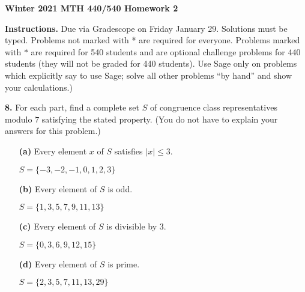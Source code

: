 \documentclass[12pt]{amsart}
\begin{document}
{\bf Winter 2021 MTH 440/540 Homework 2}

\medskip

{\bf Instructions.}  Due via Gradescope on Friday January 29.  Solutions must be typed.  Problems not marked with * are required for everyone.  Problems marked with $*$ are required for 540 students and are optional challenge problems for 440 students  (they will not be graded for 440 students).  Use Sage only on problems which explicitly say to use Sage; solve all other problems ``by hand'' and show your calculations.)

\medskip

{\bf 8.} For each part, find a complete set $S$ of congruence class representatives modulo $7$ satisfying the stated property. (You do not have to explain your answers for this problem.)
\begin{itemize}
\item[{\bf (a)}] Every element $x$ of $S$ satisfies $|x|\leq3$.

\medskip
$S = \{-3, -2, -1, 0, 1, 2, 3\}$
\medskip

\item[{\bf (b)}] Every element of $S$ is odd.

\medskip
$S = \{1, 3, 5, 7, 9, 11, 13 \}$
\medskip

\item[{\bf (c)}] Every element of $S$ is divisible by $3$.

\medskip
$S = \{0,3,6,9,12,15 \}$
\medskip

\item[{\bf (d)}] Every element of $S$ is prime.

\medskip
$S = \{2,3,5,7,11,13,29\} $
\medskip

\end{itemize}

\medskip
\end{document}
